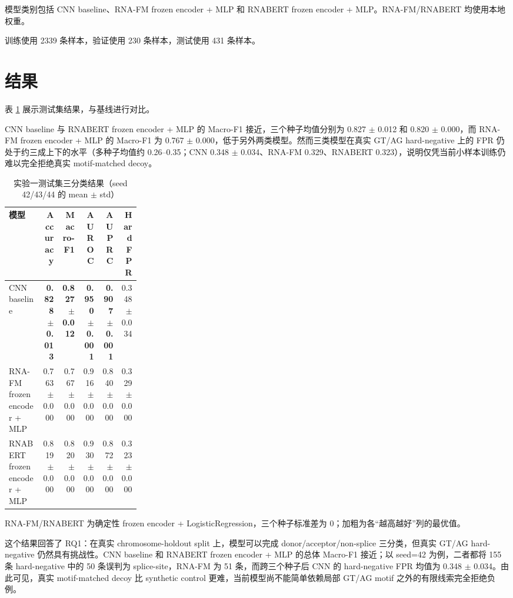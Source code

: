 \documentclass[
    oneside,
    fontset = win,
  ]{njuthesis}
\begin{document}
模型类别包括 CNN baseline、RNA-FM frozen encoder + MLP 和 RNABERT frozen encoder + MLP。RNA-FM/RNABERT 均使用本地权重。

训练使用 2339 条样本，验证使用 230 条样本，测试使用 431 条样本。

\section{结果}

表 \ref{tab:exp1-test} 展示测试集结果，与基线进行对比。

CNN baseline 与 RNABERT frozen encoder + MLP 的 Macro-F1 接近，三个种子均值分别为 0.827 $\pm$ 0.012 和 0.820 $\pm$ 0.000，而 RNA-FM frozen encoder + MLP 的 Macro-F1 为 0.767 $\pm$ 0.000，低于另外两类模型。然而三类模型在真实 GT/AG hard-negative 上的 FPR 仍处于约三成上下的水平（多种子均值约 0.26--0.35；CNN 0.348 $\pm$ 0.034、RNA-FM 0.329、RNABERT 0.323），说明仅凭当前小样本训练仍难以完全拒绝真实 motif-matched decoy。

\begin{table}[H]
  \centering
  \caption{实验一测试集三分类结果（seed 42/43/44 的 mean $\pm$ std）}
  \label{tab:exp1-test}
  \footnotesize
  \setlength{\tabcolsep}{4pt}
  \begin{tabular}{>{\raggedright\arraybackslash}p{0.26\linewidth}rrrrr}
    \hline
    模型 & Accuracy & Macro-F1 & AUROC & AUPRC & Hard FPR \\
    \hline
    CNN baseline & \textbf{0.828$\pm$0.013} & \textbf{0.827$\pm$0.012} & \textbf{0.950$\pm$0.001} & \textbf{0.907$\pm$0.001} & 0.348$\pm$0.034 \\
    RNA-FM frozen encoder + MLP & 0.763$\pm$0.000 & 0.767$\pm$0.000 & 0.916$\pm$0.000 & 0.840$\pm$0.000 & 0.329$\pm$0.000 \\
    RNABERT frozen encoder + MLP & 0.819$\pm$0.000 & 0.820$\pm$0.000 & 0.930$\pm$0.000 & 0.872$\pm$0.000 & 0.323$\pm$0.000 \\
    \hline
  \end{tabular}

  {\footnotesize RNA-FM/RNABERT 为确定性 frozen encoder + LogisticRegression，三个种子标准差为 0；加粗为各“越高越好”列的最优值。}
\end{table}

这个结果回答了 RQ1：在真实 chromosome-holdout split 上，模型可以完成 donor/acceptor/non-splice 三分类，但真实 GT/AG hard-negative 仍然具有挑战性。CNN baseline 和 RNABERT frozen encoder + MLP 的总体 Macro-F1 接近；以 seed=42 为例，二者都将 155 条 hard-negative 中的 50 条误判为 splice-site，RNA-FM 为 51 条，而跨三个种子后 CNN 的 hard-negative FPR 均值为 0.348 $\pm$ 0.034。由此可见，真实 motif-matched decoy 比 synthetic control 更难，当前模型尚不能简单依赖局部 GT/AG motif 之外的有限线索完全拒绝负例。
\end{document}
